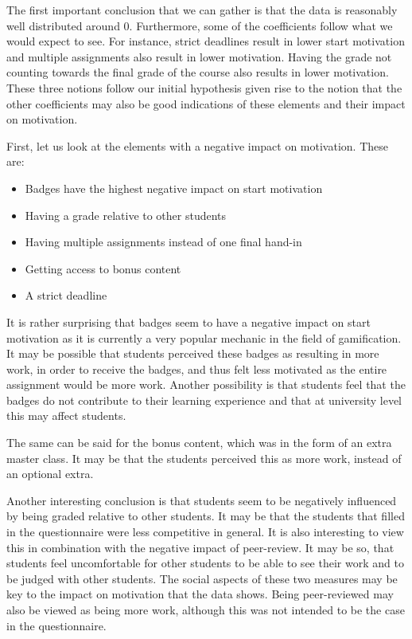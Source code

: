 \documentclass[11pt]{article}
\begin{document}
The first important conclusion that we can gather is that the data is reasonably well distributed around $0$. Furthermore, some of the coefficients follow what we would expect to see. For instance, strict deadlines result in lower start motivation and multiple assignments also result in lower motivation. Having the grade not counting towards the final grade of the course also results in lower motivation. These three notions follow our initial hypothesis given rise to the notion that the other coefficients may also be good indications of these elements and their impact on motivation.

First, let us look at the elements with a negative impact on motivation. These are:
\begin{itemize}
  \item Badges have the highest negative impact on start motivation
  \item Having a grade relative to other students
  \item Having multiple assignments instead of one final hand-in
  \item Getting access to bonus content
  \item A strict deadline
\end{itemize}

It is rather surprising that badges seem to have a negative impact on start motivation as it is currently a very popular mechanic in the field of gamification. It may be possible that students perceived these badges as resulting in more work, in order to receive the badges, and thus felt less motivated as the entire assignment would be more work. Another possibility is that students feel that the badges do not contribute to their learning experience and that at university level this may affect students.

The same can be said for the bonus content, which was in the form of an extra master class. It may be that the students perceived this as more work, instead of an optional extra.

Another interesting conclusion is that students seem to be negatively influenced by being graded relative to other students. It may be that the students that filled in the questionnaire were less competitive in general. It is also interesting to view this in combination with the negative impact of peer-review. It may be so, that students feel uncomfortable for other students to be able to see their work and to be judged with other students. The social aspects of these two measures may be key to the impact on motivation that the data shows. Being peer-reviewed may also be viewed as being more work, although this was not intended to be the case in the questionnaire.
\end{document}
